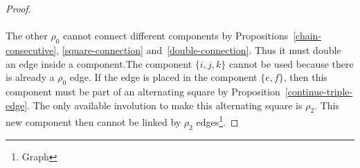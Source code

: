 \begin{proof}
  \begin{figure}[H]
    \begin{center}
      \caption{}
    \end{center}
  \end{figure}

  \paragraph{}The other $\rho_0$ cannot connect different components by Propositions~\ref{chain-consecutive}, \ref{square-connection} and~\ref{double-connection}. Thus it must double an edge inside a component.The component $\{i,j,k\}$ cannot be used because there is already a $\rho_0$ edge. If the edge is placed in the component $\{e,f\}$, then this component must be part of an alternating square by Proposition~\ref{continue-triple-edge}. The only available involution to make this alternating square is $\rho_2$. This new component then cannot be linked by $\rho_2$ edges\footnote{Graph}.


\end{proof}
